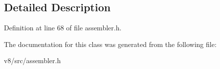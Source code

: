 \subsection{Detailed Description}


Definition at line 68 of file assembler.\+h.



The documentation for this class was generated from the following file\+:\begin{DoxyCompactItemize}
\item 
v8/src/assembler.\+h\end{DoxyCompactItemize}
